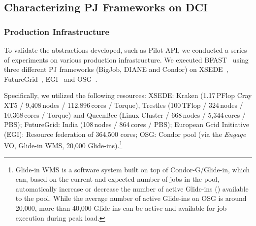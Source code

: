 \documentclass[conference]{IEEEtran}
\begin{document}
%
%

\subsection{Characterizing PJ Frameworks on DCI}
\label{sec:fg-xsede-osg-egi}


\subsubsection*{Production Infrastructure} 

To validate the abstractions developed,
such as Pilot-API, we conducted a series of
experiments on various production infrastructure. We executed
BFAST~\cite{bfast2009} using three different PJ frameworks (BigJob,
DIANE and Condor) on XSEDE~\cite{xsede}, FutureGrid~\cite{fg},
EGI~\cite{egi} and OSG~\cite{1742-6596-78-1-012057}.

Specifically, we utilized the following resources: XSEDE: Kraken (1.17\,PFlop 
Cray XT5 / 9,408\,nodes / 112,896\,cores / Torque), Trestles 
(100\,TFlop / 324\,nodes / 10,368\,cores / Torque) and QueenBee
(Linux Cluster / 668\,nodes / 5,344\,cores / PBS); FutureGrid:
India (108\,nodes / 864\,cores / PBS); European Grid
Initiative (EGI): Resource federation of 364,500 cores;
OSG: Condor pool (via the \textit{Engage} VO, Glide-in WMS,
20,000 Glide-ins).\footnote{Glide-in WMS is a software system built on
top of Condor-G/Glide-in, which can, based on the current and expected
number of jobs in the pool,  automatically increase or decrease the
number of active Glide-ins (\pilots) available to the pool.  While the
average number of active Glide-ins on OSG is around 20,000, more than
40,000 Glide-ins can be active and available for job execution during
peak load.}
\end{document}
